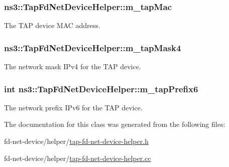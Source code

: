 \subsubsection[{\texorpdfstring{m\+\_\+tap\+Mac}{m_tapMac}}]{ ns3\+::\+Tap\+Fd\+Net\+Device\+Helper\+::m\+\_\+tap\+Mac\hspace{0.3cm}{\ttfamily [protected]}}\hypertarget{classns3_1_1TapFdNetDeviceHelper_a9a9956264595716d15dce3a036621437}{}\label{classns3_1_1TapFdNetDeviceHelper_a9a9956264595716d15dce3a036621437}
The T\+AP device M\+AC address. 
\subsubsection[{\texorpdfstring{m\+\_\+tap\+Mask4}{m_tapMask4}}]{ ns3\+::\+Tap\+Fd\+Net\+Device\+Helper\+::m\+\_\+tap\+Mask4\hspace{0.3cm}{\ttfamily [protected]}}\hypertarget{classns3_1_1TapFdNetDeviceHelper_a74e547cfb30f02bc0987a78c7c2465ee}{}\label{classns3_1_1TapFdNetDeviceHelper_a74e547cfb30f02bc0987a78c7c2465ee}
The network mask I\+Pv4 for the T\+AP device. 
\subsubsection[{\texorpdfstring{m\+\_\+tap\+Prefix6}{m_tapPrefix6}}]{\setlength{\rightskip}{0pt plus 5cm}int ns3\+::\+Tap\+Fd\+Net\+Device\+Helper\+::m\+\_\+tap\+Prefix6\hspace{0.3cm}{\ttfamily [protected]}}\hypertarget{classns3_1_1TapFdNetDeviceHelper_a9d2b4e1c9fcff1a2b254681f0e8f3719}{}\label{classns3_1_1TapFdNetDeviceHelper_a9d2b4e1c9fcff1a2b254681f0e8f3719}
The network prefix I\+Pv6 for the T\+AP device. 

The documentation for this class was generated from the following files\+:\begin{DoxyCompactItemize}
\item 
fd-\/net-\/device/helper/\hyperlink{tap-fd-net-device-helper_8h}{tap-\/fd-\/net-\/device-\/helper.\+h}\item 
fd-\/net-\/device/helper/\hyperlink{tap-fd-net-device-helper_8cc}{tap-\/fd-\/net-\/device-\/helper.\+cc}\end{DoxyCompactItemize}
